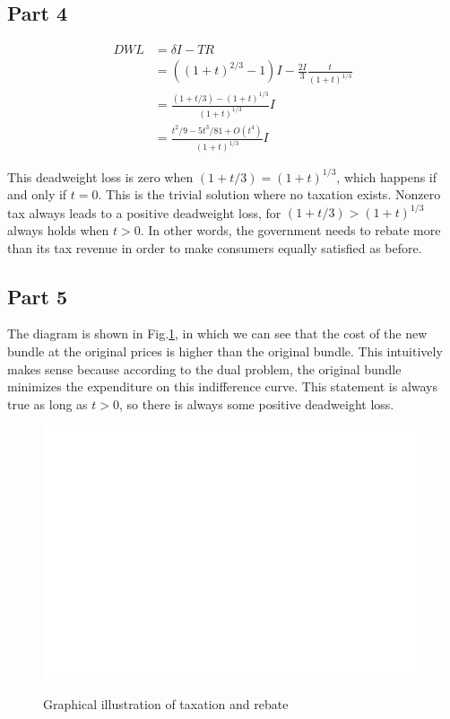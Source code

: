 \documentclass{article}
\begin{document}
\subsection{Part 4}
\begin{align*}
	DWL&=\delta I-TR\\
	&=\left((1+t)^{2/3}-1\right)I-\frac{2I}{3}\frac{t}{(1+t)^{1/3}}\\
	&=\frac{(1+t/3)-(1+t)^{1/3}}{(1+t)^{1/3}}I\\
	&=\frac{t^2/9-5t^3/81+O(t^4)}{(1+t)^{1/3}}I
\end{align*}

This deadweight loss is zero when $(1+t/3)=(1+t)^{1/3}$, which happens if and only if $t=0$. This is the trivial solution where no taxation exists. Nonzero tax always leads to a positive deadweight loss, for $(1+t/3)>(1+t)^{1/3}$ always holds when $t>0$. In other words, the government needs to rebate more than its tax revenue in order to make consumers equally satisfied as before.

\subsection{Part 5}
The diagram is shown in Fig.\ref{blank}, in which we can see that the cost of the new bundle at the original prices is higher than the original bundle. This intuitively makes sense because according to the dual problem, the original bundle minimizes the expenditure on this indifference curve. This statement is always true as long as $t>0$, so there is always some positive deadweight loss.
\begin{figure}[!htbp]
	\centering
	\includegraphics[width=12cm]{blank.png}\\
	\caption{Graphical illustration of taxation and rebate}
	\label{blank}
\end{figure}
\end{document}
